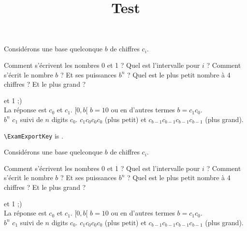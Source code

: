 \documentclass[french]{exercice}
\title{Test}
\author{}
\begin{document}
\maketitle
\listofexercises


\begin{Exercise}[title={Système positionnel}]

  Considérons une base quelconque $b$ de chiffres $c_i$.

\Question 
Comment s'écrivent les nombres 0 et 1 ?
\Question
Quel est l’intervalle pour $i$ ?
\Question
Comment s'écrit le nombre $b$ ? Et ses puissances $b^n$ ?
\Question
Quel est le plus petit nombre à 4 chiffres ? Et le plus grand ?
\end{Exercise}

\begin{Answer}
   et 1 ;)  
  \\
  La réponse est $c_0$ et $c_1$.
  \Question
  $[0, b[$
  \Question
  $b=10$ ou en d'autres termes $b=c_1c_0$.
  \\
  $b^n$ $c_1$ suivi de $n$ digits $c_0$. 
  \Question
  $c_1c_0c_0c_0$ (plus petit) et   $c_{b-1}c_{b-1}c_{b-1}c_{b-1}$ (plus grand).
\end{Answer}

\ExamNewpage
{}




\verb|\ExamExportKey| is \texttt{\meaning\ExamExportKey}.



\clearpage 
\begin{Exercise}[title={Système positionnel II}]
  Considérons une base quelconque $b$ de chiffres $c_i$.

\Question 
Comment s'écrivent les nombres 0 et 1 ?
\Question
Quel est l’intervalle pour $i$ ?
\Question
Comment s'écrit le nombre $b$ ? Et ses puissances $b^n$ ?
\Question
Quel est le plus petit nombre à 4 chiffres ? Et le plus grand ?
\end{Exercise}

\begin{Answer}
   et 1 ;)  
  \\
  La réponse est $c_0$ et $c_1$.
  \Question
  $[0, b[$
  \Question
  $b=10$ ou en d'autres termes $b=c_1c_0$.
  \\
  $b^n$ $c_1$ suivi de $n$ digits $c_0$. 
  \Question
  $c_1c_0c_0c_0$ (plus petit) et   $c_{b-1}c_{b-1}c_{b-1}c_{b-1}$ (plus grand).
\end{Answer}
\end{document}

